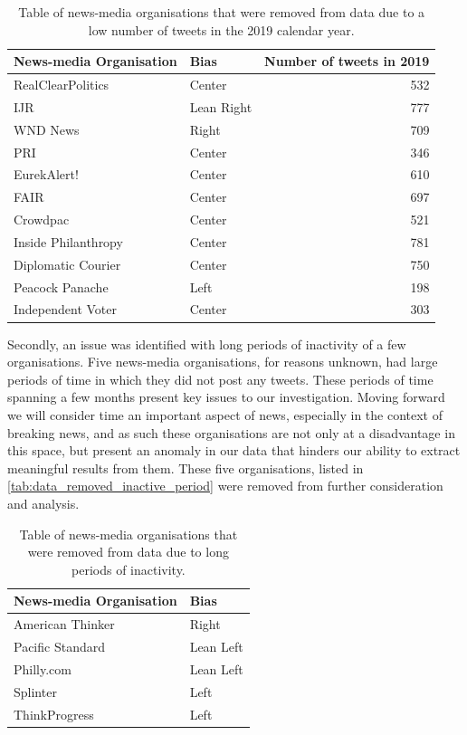 \begin{table}[h!]
	\centering
	\begin{tabular}{llr}
		\toprule
		News-media Organisation &    Bias  &  Number of tweets in 2019\\
		\midrule
		RealClearPolitics &      Center &  532 \\
		IJR  &  Lean Right &  777 \\
		WND News &         Right &  709 \\
		PRI &                Center &  346 \\
		EurekAlert! &            Center &  610 \\
		FAIR &     Center &  697 \\
		Crowdpac &            Center &  521 \\
		Inside Philanthropy &        Center &  781 \\
		Diplomatic Courier &         Center &  750 \\
		Peacock Panache &          Left &  198 \\
		Independent Voter &            Center &  303 \\
		\bottomrule
	\end{tabular}
\caption{Table of news-media organisations that were removed from data due to a low number of tweets in the 2019 calendar year.}
\label{tab:data_removed_low_tweet_counts}
\end{table}

Secondly, an issue was identified with long periods of inactivity of a few organisations. Five news-media organisations, for reasons unknown, had large periods of time in which they did not post any tweets. These periods of time spanning a few months present key issues to our investigation. Moving forward we will consider time an important aspect of news, especially in the context of breaking news, and as such these organisations are not only at a disadvantage in this space, but present an anomaly in our data that hinders our ability to extract meaningful results from them. These five organisations, listed in \autoref{tab:data_removed_inactive_period} were removed from further consideration and analysis.

\begin{table}[h!]
	\centering
	\begin{tabular}{ll}
		\toprule
		News-media Organisation &    Bias \\
		\midrule
		American Thinker  &      Right \\
		Pacific Standard &  Lean Left \\
		Philly.com  &  Lean Left \\
		Splinter &       Left \\
		ThinkProgress  &       Left \\
		\bottomrule
	\end{tabular}
	\caption{Table of news-media organisations that were removed from data due to long periods of inactivity.}
	\label{tab:data_removed_inactive_period}
\end{table}


